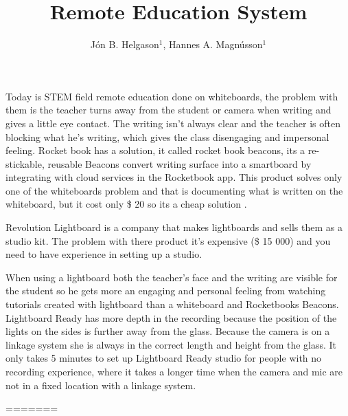 \documentclass[a4paper]{jpconf}
\begin{document}
	Today is STEM field remote education done on whiteboards, the problem with them is the teacher turns away from the student or camera when writing and gives a little eye contact. The writing isn't always clear and the teacher is often blocking what he's writing, which gives the class disengaging and impersonal feeling. 
	Rocket book has a solution, it called rocket book beacons, its a re-stickable, reusable Beacons convert writing surface into a smartboard by integrating with cloud services in the Rocketbook app.
	This product solves only one of the whiteboards problem and that is documenting what is written on the whiteboard, but it cost only \$ 20 so its a cheap solution \cite{Rocketbook}.
	
	Revolution Lightboard is a company that makes lightboards and sells them as a studio kit. The problem with there product it's expensive (\$ 15 000) and you need to have experience in setting up a studio\cite{Revolution}.
	
	When using a lightboard both the teacher's face and the writing are visible for the student so he gets more an engaging and personal feeling from watching tutorials created with lightboard than a whiteboard and Rocketbooks Beacons.
	Lightboard Ready has more depth in the recording because the position of the lights on the sides is further away from the glass.
	Because the camera is on a linkage system she is always in the correct length and height from the glass.  
	It only takes 5 minutes to set up Lightboard Ready studio for people with no recording experience, where it takes a longer time when the camera and mic are not in a fixed location with a linkage system.
	
	
	
=======
\title{Remote Education System}

\author{ J\'on B. Helgason$^{1}$, Hannes A. Magnússon$^{1}$}

\address{$^{1}$Reykjavik University, Menntavegur 1, Reykjavik 102, Iceland}

\end{document}
